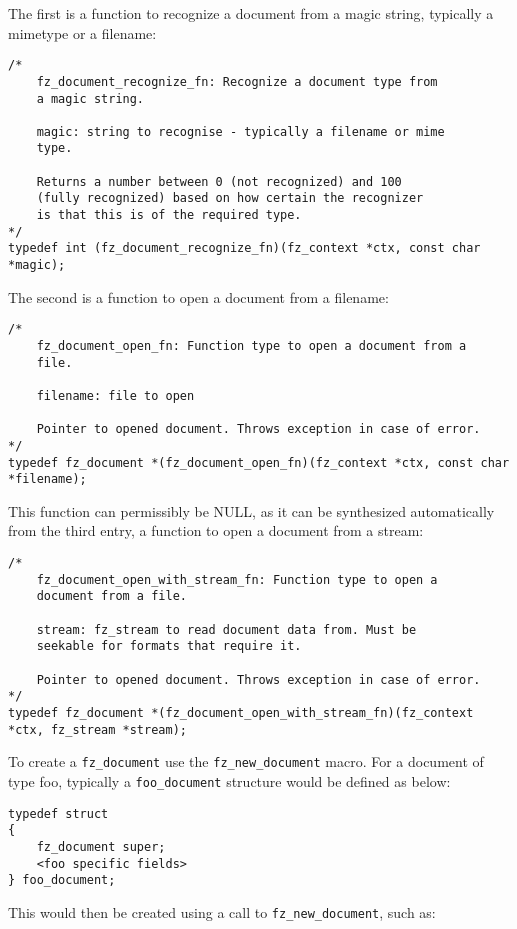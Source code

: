 \documentclass[oneside]{book}
\begin{document}
The first is a function to recognize a document from a magic string, typically a mimetype or a filename:

\begin{lstlisting}
/*
	fz_document_recognize_fn: Recognize a document type from
	a magic string.

	magic: string to recognise - typically a filename or mime
	type.

	Returns a number between 0 (not recognized) and 100
	(fully recognized) based on how certain the recognizer
	is that this is of the required type.
*/
typedef int (fz_document_recognize_fn)(fz_context *ctx, const char *magic);
\end{lstlisting}

The second is a function to open a document from a filename:

\begin{lstlisting}
/*
	fz_document_open_fn: Function type to open a document from a
	file.

	filename: file to open

	Pointer to opened document. Throws exception in case of error.
*/
typedef fz_document *(fz_document_open_fn)(fz_context *ctx, const char *filename);
\end{lstlisting}

This function can permissibly be NULL, as it can be synthesized automatically from the third entry, a function to open a document from a stream:

\begin{lstlisting}
/*
	fz_document_open_with_stream_fn: Function type to open a
	document from a file.

	stream: fz_stream to read document data from. Must be
	seekable for formats that require it.

	Pointer to opened document. Throws exception in case of error.
*/
typedef fz_document *(fz_document_open_with_stream_fn)(fz_context *ctx, fz_stream *stream);
\end{lstlisting}

To create a \texttt{fz\_document} use the \texttt{fz\_new\_document} macro. For a document of type foo, typically a \texttt{foo\_document} structure would be defined as below:

\begin{lstlisting}
typedef struct
{
	fz_document super;
	<foo specific fields>
} foo_document;
\end{lstlisting}

This would then be created using a call to \texttt{fz\_new\_document}, such as:
\end{document}

